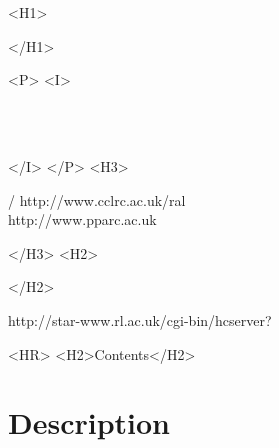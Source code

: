 \begin{htmlonly}
   \xlabel{}
   \begin{rawhtml} <H1> \end{rawhtml}
      \stardoctitle
   \begin{rawhtml} </H1> \end{rawhtml}


   \begin{rawhtml} <P> <I> \end{rawhtml}
   \stardoccategory\ \stardocnumber \\
   \stardocauthors \\
   \stardocdate
   \begin{rawhtml} </I> </P> <H3> \end{rawhtml}
       /
                        {http://www.cclrc.ac.uk/ral} \\
                        {http://www.pparc.ac.uk} \\
   \begin{rawhtml} </H3> <H2> \end{rawhtml}
   \begin{rawhtml} </H2> \end{rawhtml}
      {http://star-www.rl.ac.uk/cgi-bin/hcserver?\stardocsource}\\

  \label{stardoccontents}
  \begin{rawhtml} 
    <HR>
    <H2>Contents</H2>
  \end{rawhtml}

  \section{Description}

\end{htmlonly}

